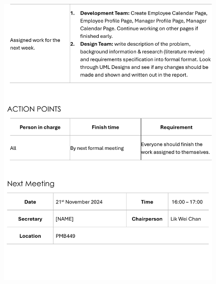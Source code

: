 \documentclass[a4paper,12pt, oneside]{report}
\begin{document}
\begin{appendices}
\begin{figure}[H]
    \includegraphics[width=\textwidth]{Minutes/Minutes_5-cropped-2.png}
\end{figure}

\end{appendices}
\end{document}
